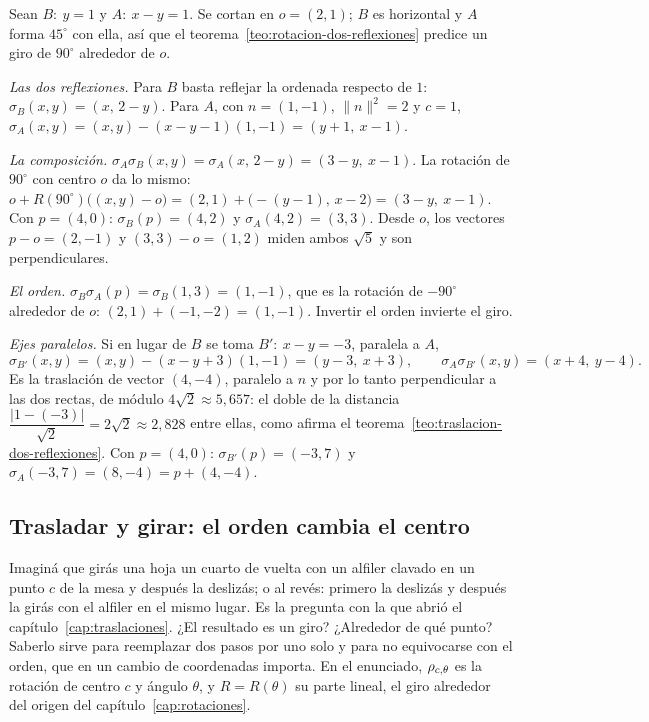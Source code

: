 \begin{ejemplo}\label{ej:dos-reflexiones}
Sean \(B:\ y=1\) y \(A:\ x-y=1\). Se cortan en \(o=(2,1)\); \(B\) es horizontal y \(A\) forma
\(45^\circ\) con ella, así que el teorema~\ref{teo:rotacion-dos-reflexiones} predice un giro de \(90^\circ\) alrededor de \(o\).

\emph{Las dos reflexiones.} Para \(B\) basta reflejar la ordenada respecto de \(1\):
\(\sigma_{B}(x,y)=(x,\,2-y)\). Para \(A\), con \(n=(1,-1)\), \(\lVert n\rVert^2=2\) y \(c=1\),
\(\sigma_{A}(x,y)=(x,y)-(x-y-1)(1,-1)=(y+1,\ x-1)\).

\emph{La composición.} \(\sigma_{A}\sigma_{B}(x,y)=\sigma_{A}(x,\,2-y)=(3-y,\ x-1)\). La rotación de \(90^\circ\) con centro \(o\) da lo mismo:
\(o+R(90^\circ)\bigl((x,y)-o\bigr)=(2,1)+\bigl(-(y-1),\,x-2\bigr)=(3-y,\ x-1)\).
Con \(p=(4,0)\): \(\sigma_{B}(p)=(4,2)\) y \(\sigma_{A}(4,2)=(3,3)\). Desde \(o\), los vectores
\(p-o=(2,-1)\) y \((3,3)-o=(1,2)\) miden ambos \(\sqrt5\) y son perpendiculares.

\emph{El orden.} \(\sigma_{B}\sigma_{A}(p)=\sigma_{B}(1,3)=(1,-1)\), que es la rotación de
\(-90^\circ\) alrededor de \(o\): \((2,1)+(-1,-2)=(1,-1)\). Invertir el orden invierte el giro.

\emph{Ejes paralelos.} Si en lugar de \(B\) se toma \(B':\ x-y=-3\), paralela a \(A\),
\[
  \sigma_{B'}(x,y)=(x,y)-(x-y+3)(1,-1)=(y-3,\ x+3),
  \qquad
  \sigma_{A}\sigma_{B'}(x,y)=(x+4,\ y-4).
\]
Es la traslación de vector \((4,-4)\), paralelo a \(n\) y por lo tanto perpendicular a las dos
rectas, de módulo \(4\sqrt2\approx5{,}657\): el doble de la distancia
\(\dfrac{|1-(-3)|}{\sqrt2}=2\sqrt2\approx2{,}828\) entre ellas, como afirma el teorema~\ref{teo:traslacion-dos-reflexiones}.
Con \(p=(4,0)\): \(\sigma_{B'}(p)=(-3,7)\) y \(\sigma_{A}(-3,7)=(8,-4)=p+(4,-4)\).
\end{ejemplo}


\subsection{Trasladar y girar: el orden cambia el centro}\label{sec:trasladar-girar}

Imaginá que girás una hoja un cuarto de vuelta con un alfiler clavado en un punto \(c\) de la
mesa y después la deslizás; o al revés: primero la deslizás y después la girás con el alfiler en
el mismo lugar. Es la pregunta con la que abrió el capítulo~\ref{cap:traslaciones}. ¿El
resultado es un giro? ¿Alrededor de qué punto? Saberlo sirve para reemplazar dos pasos por uno
solo y para no equivocarse con el orden, que en un cambio de coordenadas importa. En el
enunciado, \(\rho_{c,\theta}\) es la rotación de centro \(c\) y ángulo \(\theta\), y \(R=R(\theta)\) su parte lineal, el giro
alrededor del origen del capítulo~\ref{cap:rotaciones}.

